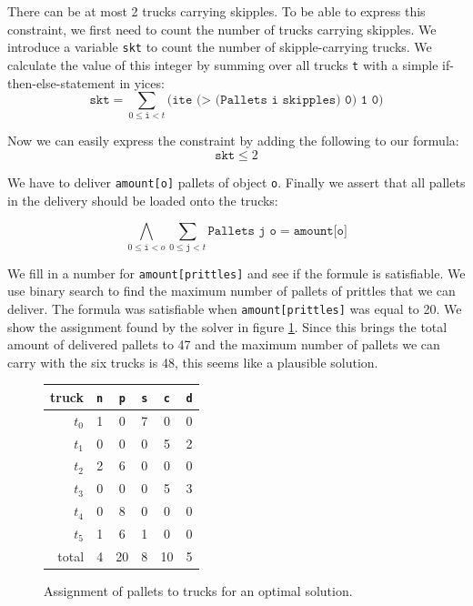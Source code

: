 \documentclass[12pt]{article}
\begin{document}
There can be at most 2 trucks carrying skipples. To be able to express this constraint, we first need to count the number of trucks carrying skipples. We introduce a variable \texttt{skt} to count the number of skipple-carrying trucks. We calculate the value of this integer by summing over all trucks \texttt{t} with a simple if-then-else-statement in yices: 
\[ \texttt{skt} = \sum_{0\le \texttt{i} < t} \texttt{(ite (> (Pallets i skipples) 0) 1 0)}\]

Now we can easily express the constraint by adding the following to our formula:
\[ \texttt{skt} \le 2 \]

We have to deliver \texttt{amount[o]} pallets of object \texttt{o}. Finally we assert that all pallets in the delivery should be loaded onto the trucks:

\[ \bigwedge_{0 \le \texttt{i} < o} \sum_{0 \le \texttt{j} < t} \texttt{Pallets j o} = \texttt{amount[o]}\]

We fill in a number for \texttt{amount[prittles]} and see if the formule is satisfiable. We use binary search to find the maximum number of pallets of prittles that we can deliver.
The formula was satisfiable when \texttt{amount[prittles]} was equal to 20.
We show the assignment found by the solver in figure \ref{fig:sub1table}.
Since this brings the total amount of delivered pallets to 47 and the maximum number of pallets we can carry with the six trucks is 48, this seems like a plausible solution.

\begin{figure}[h]
    \begin{center}
        \begin{tabular}{r|ccccc}
        truck & \texttt{n} & \texttt{p} & \texttt{s} & \texttt{c} & \texttt{d} \\\hline
        $t_0$ & 1 & 0 & 7 & 0 & 0 \\
        $t_1$ & 0 & 0 & 0 & 5 & 2 \\
        $t_2$ & 2 & 6 & 0 & 0 & 0 \\
        $t_3$ & 0 & 0 & 0 & 5 & 3 \\
        $t_4$ & 0 & 8 & 0 & 0 & 0 \\
        $t_5$ & 1 & 6 & 1 & 0 & 0 \\\hline
        total & 4 & 20 & 8 & 10 & 5 \\
        \end{tabular}
    \end{center}
    \caption{Assignment of pallets to trucks for an optimal solution.}
    \label{fig:sub1table}
\end{figure}
\end{document}
